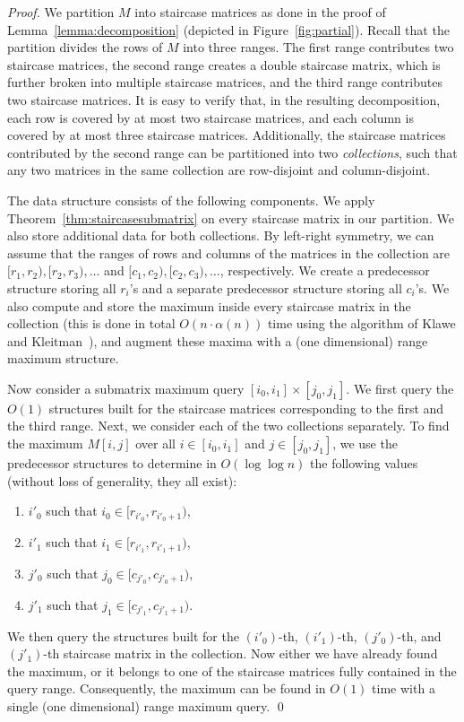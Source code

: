 \documentclass{llncs}
\begin{document}
\begin{proof}
We partition $M$ into staircase matrices as done in the proof of Lemma~\ref{lemma:decomposition} (depicted in
Figure~\ref{fig:partial}). 
Recall that the partition divides the rows of $M$ into three ranges. The first range
contributes two staircase matrices, the second range creates a double staircase
matrix, which is further broken into multiple staircase matrices, and the third range
contributes two staircase matrices. 
It is easy to verify that, in the resulting decomposition, each row
is covered by at most two staircase matrices, and each column is covered
by at most three staircase matrices.
Additionally, the staircase matrices contributed by the second range
can be partitioned into two \emph{collections},
such that any two matrices in the same collection are row-disjoint and
column-disjoint.




The data structure consists of the following components. We apply Theorem~\ref{thm:staircasesubmatrix} on every staircase  matrix in our partition. We also store additional
data for both collections. By left-right symmetry, we can assume that
the ranges of rows and columns of the matrices in the collection
are $[r_{1},r_{2}), [r_{2},r_{3}),\ldots$ and $[c_{1},c_{2}),[c_{2},c_{3}),\ldots$, respectively.
We create a predecessor structure storing all $r_{i}$'s and a separate predecessor structure
storing all $c_{i}$'s. We also compute and store the maximum inside every staircase 
matrix in the collection (this is done in total $O(n\cdot \alpha(n))$ time using the algorithm of Klawe and Kleitman~\cite{KK89}), and augment these maxima with a (one dimensional) range maximum structure.

Now consider a submatrix maximum query  $[i_{0},i_{1}]\times [j_{0},j_{1}]$. We first query the $O(1)$ structures built for
the staircase matrices corresponding to the first and the third range.
Next, we consider each of the two collections separately. To find the maximum $M[i,j]$ over
all $i\in [i_{0},i_{1}]$ and $j\in [j_{0},j_{1}]$, we use the predecessor structures
to determine in $O(\log \log n)$ the following values (without loss of generality,
they all exist):
\begin{enumerate}
\item $i'_{0}$ such that $i_{0}\in [r_{i'_{0}},r_{i'_{0}+1})$,
\item $i'_{1}$ such that $i_{1}\in [r_{i'_{1}},r_{i'_{1}+1})$,
\item $j'_{0}$ such that $j_{0}\in [c_{j'_{0}},c_{j'_{0}+1})$,
\item $j'_{1}$ such that $j_{1}\in [c_{j'_{1}},c_{j'_{1}+1})$.
\end{enumerate}
We then query the structures built for the $(i'_{0})$-th, $(i'_{1})$-th,
$(j'_{0})$-th, and $(j'_{1})$-th staircase matrix in the collection.
Now either we have already found the maximum, or it belongs
to one of the staircase matrices fully contained in the query range. Consequently, the maximum
can be found in $O(1)$ time with a single (one dimensional) range maximum query.
\qed \end{proof}
\end{document}
